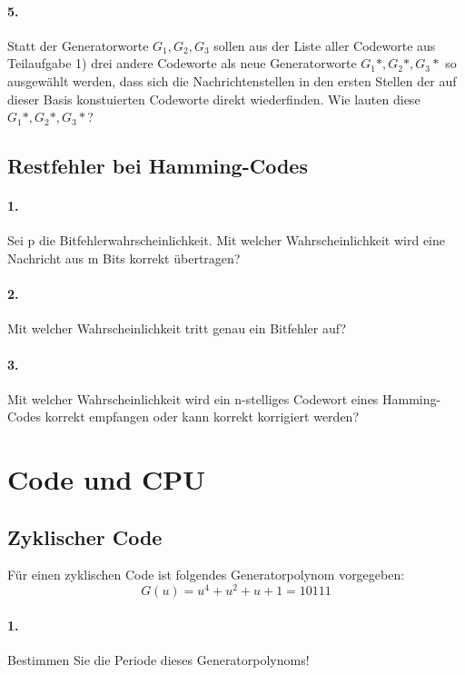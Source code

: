 \documentclass[paper=a4, fontsize=11pt]{scrartcl}
\numberwithin{equation}{section}
\numberwithin{figure}{section}
\numberwithin{table}{section}
\begin{document}
\paragraph{5.}
Statt der Generatorworte $G_{1}, G_{2}, G_{3}$ sollen aus der Liste aller Codeworte aus Teilaufgabe 1) drei andere Codeworte als neue Generatorworte $G_{1}*, G_{2}*, G_{3}*$ so ausgewählt werden, dass sich die Nachrichtenstellen in den ersten Stellen der auf dieser Basis konstuierten Codeworte direkt wiederfinden. Wie lauten diese $G_{1}*, G_{2}*, G_{3}*$?

\subsection{Restfehler bei Hamming-Codes}
\paragraph{1.}
Sei p die Bitfehlerwahrscheinlichkeit. Mit welcher Wahrscheinlichkeit wird eine Nachricht aus m Bits korrekt übertragen?

\paragraph{2.}
Mit welcher Wahrscheinlichkeit tritt genau ein Bitfehler auf?

\paragraph{3.}
Mit welcher Wahrscheinlichkeit wird ein n-stelliges Codewort eines Hamming-Codes korrekt empfangen oder kann korrekt korrigiert werden?

\section{Code und CPU}
\subsection{Zyklischer Code}
Für einen zyklischen Code ist folgendes Generatorpolynom vorgegeben:
$$G(u)=u^{4}+u^{2}+u+1=10111$$

\paragraph{1.}
Bestimmen Sie die Periode dieses Generatorpolynoms!
\end{document}
